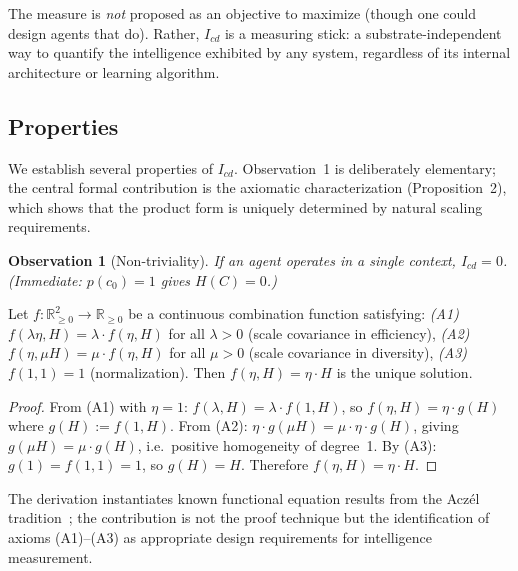 \documentclass[runningheads,a4paper]{llncs}
\newtheorem{observation}{Observation}
\begin{document}
The measure is \emph{not} proposed as an objective to maximize (though one could design agents that do). Rather, $I_{cd}$ is a measuring stick: a substrate-independent way to quantify the intelligence exhibited by any system, regardless of its internal architecture or learning algorithm.

\subsection{Properties}
\label{sec:properties}

We establish several properties of $I_{cd}$. Observation~1 is deliberately elementary; the central formal contribution is the axiomatic characterization (Proposition~2), which shows that the product form is uniquely determined by natural scaling requirements.

\begin{observation}[Non-triviality]
If an agent operates in a single context, $I_{cd} = 0$. \emph{(Immediate: $p(c_0){=}1$ gives $H(C){=}0$.)}
\end{observation}

\begin{proposition}
Let $f: \mathbb{R}_{\geq 0}^2 \to \mathbb{R}_{\geq 0}$ be a continuous combination function satisfying:
\emph{(A1)} $f(\lambda\eta, H) = \lambda \cdot f(\eta, H)$ for all $\lambda > 0$ (scale covariance in efficiency),
\emph{(A2)} $f(\eta, \mu H) = \mu \cdot f(\eta, H)$ for all $\mu > 0$ (scale covariance in diversity),
\emph{(A3)} $f(1, 1) = 1$ (normalization).
Then $f(\eta, H) = \eta \cdot H$ is the unique solution.
\end{proposition}
\begin{proof}
From (A1) with $\eta = 1$: $f(\lambda, H) = \lambda \cdot f(1, H)$, so $f(\eta, H) = \eta \cdot g(H)$ where $g(H) := f(1, H)$. From (A2): $\eta \cdot g(\mu H) = \mu \cdot \eta \cdot g(H)$, giving $g(\mu H) = \mu \cdot g(H)$, i.e.\ positive homogeneity of degree~1. By (A3): $g(1) = f(1,1) = 1$, so $g(H) = H$. Therefore $f(\eta, H) = \eta \cdot H$.
\end{proof}

The derivation instantiates known functional equation results from the Acz\'{e}l tradition~\cite{aczel1966lectures}; the contribution is not the proof technique but the identification of axioms (A1)--(A3) as appropriate design requirements for intelligence measurement.
\end{document}

